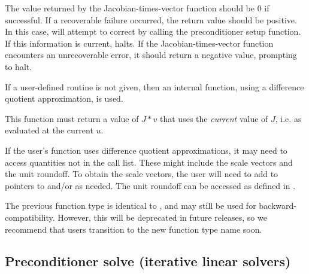 {
  The value returned by the Jacobian-times-vector function should be
  $0$ if successful. If a recoverable failure occurred, the return
  value should be positive.  In this case, {\kinsol} will attempt to
  correct by calling the preconditioner setup function. If this
  information is current, {\kinsol} halts.  If the
  Jacobian-times-vector function encounters an unrecoverable error, it
  should return a negative value, prompting {\kinsol} to halt.
}
{ If a user-defined routine is not given, then an internal 
  function, using a difference quotient approximation, is used.

  This function must return a value of $J*v$ that uses the {\it current}
  value of $J$, i.e. as evaluated at the current $u$.

  If the user's  function uses difference quotient
  approximations, it may need to access quantities not in the call list.
  These might include the scale vectors and the unit roundoff.
  To obtain the scale vectors, the user will need to add to 
  pointers to  and/or  as needed.
  The unit roundoff can be accessed as  defined in
  .

  The previous function type  is identical to
  , and may still be used for backward-compatibility.
  However, this will be deprecated in future releases, so we recommend
  that users transition to the new function type name soon.
}
\subsection{Preconditioner solve (iterative linear solvers)} \label{ss:psolveFn}

